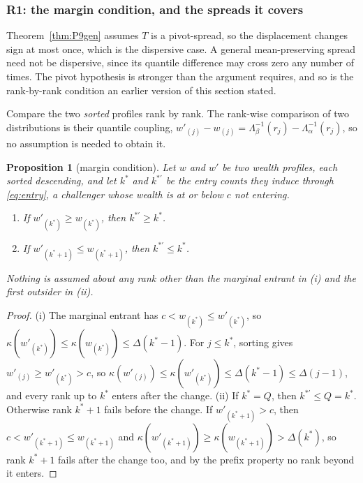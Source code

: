 \documentclass[11pt]{article}
\newtheorem{proposition}{Proposition}
\begin{document}
\subsubsection{R1: the margin condition, and the spreads it covers}
\label{prop:tail}

Theorem~\ref{thm:P9gen} assumes $T$ is a pivot-spread, so the displacement
changes sign at most once, which is the dispersive case. A general
mean-preserving spread need not be dispersive, since its quantile difference may
cross zero any number of times. The pivot hypothesis is stronger than the
argument requires, and so is the rank-by-rank condition an earlier version of
this section stated.

Compare the two \emph{sorted} profiles rank by rank. The rank-wise comparison of
two distributions is their quantile coupling,
$w'_{(j)}-w_{(j)}=\Lambda_\beta^{-1}(r_j)-\Lambda_\alpha^{-1}(r_j)$, so no
assumption is needed to obtain it.

\begin{proposition}[margin condition]
\label{prop:tailprop}
Let $w$ and $w'$ be two wealth profiles, each sorted descending, and let $k^*$
and $k^{*\prime}$ be the entry counts they induce through \eqref{eq:entry}, a
challenger whose wealth is at or below $c$ not entering.
\begin{enumerate}
\item[(i)] If $w'_{(k^*)}\ge w_{(k^*)}$, then $k^{*\prime}\ge k^*$.
\item[(ii)] If $w'_{(k^*+1)}\le w_{(k^*+1)}$, then $k^{*\prime}\le k^*$.
\end{enumerate}
Nothing is assumed about any rank other than the marginal entrant in (i) and
the first outsider in (ii).
\end{proposition}

\begin{proof}
(i) The marginal entrant has $c<w_{(k^*)}\le w'_{(k^*)}$, so
$\kappa(w'_{(k^*)})\le\kappa(w_{(k^*)})\le\Delta(k^*-1)$. For $j\le k^*$, sorting
gives $w'_{(j)}\ge w'_{(k^*)}>c$, so
$\kappa(w'_{(j)})\le\kappa(w'_{(k^*)})\le\Delta(k^*-1)\le\Delta(j-1)$, and every
rank up to $k^*$ enters after the change. (ii) If $k^*=Q$, then $k^{*\prime}\le Q=k^*$. Otherwise rank
$k^*+1$ fails before the change. If $w'_{(k^*+1)}>c$, then $c<w'_{(k^*+1)}\le w_{(k^*+1)}$ and
$\kappa(w'_{(k^*+1)})\ge\kappa(w_{(k^*+1)})>\Delta(k^*)$, so rank $k^*+1$ fails
after the change too, and by the prefix property no rank beyond it enters.
\end{proof}
\end{document}
